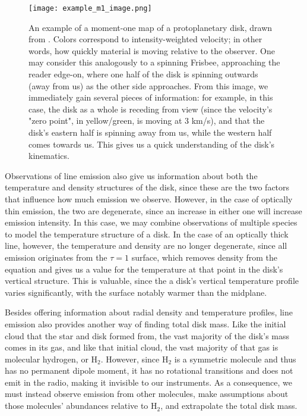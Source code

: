\begin{figure} %
\centering
  \texttt{[image: example\_m1\_image.png]}
  \caption{An example of a moment-one map of a protoplanetary disk, drawn from \citet{Rosenfeld2012}. Colors correspond to intensity-weighted velocity; in other words, how quickly material is moving relative to the observer. One may consider this analogously to a spinning Frisbee, approaching the reader edge-on, where one half of the disk is spinning outwards (away from us) as the other side approaches. From this image, we immediately gain several pieces of information: for example, in this case, the disk as a whole is receding from view (since the velocity's "zero point", in yellow/green, is moving at 3 km/s), and that the disk's eastern half is spinning away from us, while the western half comes towards us. This gives us a quick understanding of the disk's kinematics.}
  \label{fig:ex_mom1}
\end{figure}


Observations of line emission also give us information about both the temperature and density structures of the disk, since these are the two factors that influence how much emission we observe. However, in the case of optically thin emission, the two are degenerate, since an increase in either one will increase emission intensity. In this case, we may combine observations of multiple species to model the temperature structure of a disk. In the case of an optically thick line, however, the temperature and density are no longer degenerate, since all emission originates from the $\tau=1$ surface, which removes density from the equation and gives us a value for the temperature at that point in the disk's vertical structure. This is valuable, since the a disk's vertical temperature profile varies significantly, with the surface notably warmer than the midplane.

Besides offering information about radial density and temperature profiles, line emission also provides another way of finding total disk mass. Like the initial cloud that the star and disk formed from, the vast majority of the disk's mass comes in its gas, and like that initial cloud, the vast majority of that gas is molecular hydrogen, or H$_2$. However, since H$_2$ is a symmetric molecule and thus has no permanent dipole moment, it has no rotational transitions and does not emit in the radio, making it invisible to our instruments. As a consequence, we must instead observe emission from other molecules, make assumptions about those molecules' abundances relative to H$_2$, and extrapolate the total disk mass.


